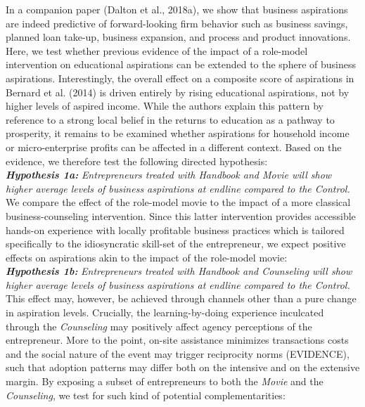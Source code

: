 \documentclass[11.5pt]{article}
\begin{document}
In a companion paper (Dalton et al., 2018a), we show that business aspirations are indeed predictive of forward-looking firm behavior such as business savings, planned loan take-up, business expansion, and process and product innovations. Here, we test whether previous evidence of the impact of a role-model intervention on educational aspirations can be extended to the sphere of business aspirations. Interestingly, the overall effect on a composite score of aspirations in Bernard et al. (2014) is driven entirely by rising educational aspirations, not by higher levels of aspired income. While the authors explain this pattern by reference to a strong local belief in the returns to education as a pathway to prosperity, it remains to be examined whether aspirations for household income or micro-enterprise profits can be affected in a different context. Based on the evidence, we therefore test the following directed hypothesis:\\

\noindent \emph{\textbf{Hypothesis 1a:}} \emph{Entrepreneurs treated with \emph{Handbook and Movie} will show higher average levels of business aspirations at endline compared to the \emph{Control}.}\\

We compare the effect of the role-model movie to the impact of a more classical business-counseling intervention. Since this latter intervention provides accessible hands-on experience with locally profitable business practices which is tailored specifically to the idiosyncratic skill-set of the entrepreneur, we expect positive effects on aspirations akin to the impact of the role-model movie: \\

\noindent \emph{\textbf{Hypothesis 1b:}} \emph{Entrepreneurs treated with \emph{Handbook and Counseling} will show higher average levels of business aspirations at endline compared to the \emph{Control}.} \\

 This effect may, however, be achieved through channels other than a pure change in aspiration levels. Crucially, the learning-by-doing experience inculcated through the \emph{Counseling} may positively affect agency perceptions of the entrepreneur. More to the point, on-site assistance minimizes transactions costs and the social nature of the event may trigger reciprocity norms (EVIDENCE), such that adoption patterns may differ both on the intensive and on the extensive margin. By exposing a subset of entrepreneurs to both the \emph{Movie} and the \emph{Counseling}, we test for such kind of potential complementarities: \\
\end{document}
